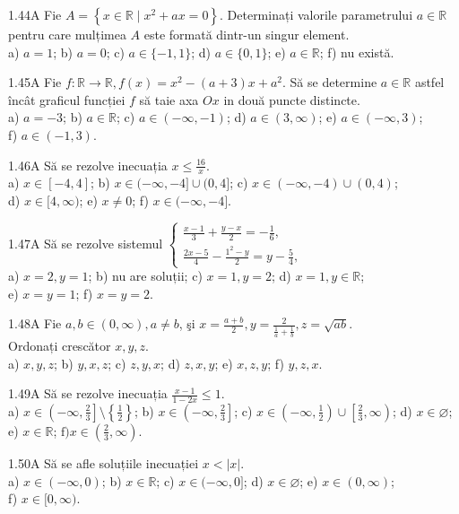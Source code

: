 \documentclass[11pt]{article}
\begin{document}
1.44A Fie $A=\left\{x \in \mathbb{R} \mid x^{2}+a x=0\right\}$. Determinați valorile parametrului $a \in \mathbb{R}$ pentru care mulțimea $A$ este formată dintr-un singur element.\\ a) $a=1$; b) $a=0$; c) $a \in\{-1,1\}$; d) $a \in\{0,1\}$; e) $a \in \mathbb{R}$; f) nu există.

1.45A Fie $f: \mathbb{R} \rightarrow \mathbb{R}, f(x)=x^{2}-(a+3) x+a^{2}$. Să se determine $a \in \mathbb{R}$ astfel încât graficul funcției $f$ să taie axa $O x$ in două puncte distincte.\\ a) $a=-3$; b) $a \in \mathbb{R}$; c) $a \in(-\infty,-1)$; d) $a \in(3, \infty)$; e) $a \in(-\infty, 3)$;\\ f) $a \in(-1, 3)$.

1.46A Să se rezolve inecuația $x \leq \frac{16}{x}$.\\ a) $x \in[-4,4]$; b) $x \in(-\infty,-4] \cup(0,4]$; c) $x \in(-\infty,-4) \cup(0,4)$;\\ d) $x \in[4, \infty)$; e) $x \neq 0$; f) $x \in(-\infty,-4]$.

1.47A Să se rezolve sistemul $\left\{\begin{array}{l}\frac{x-1}{3}+\frac{y-x}{2}=-\frac{1}{6}, \\ \frac{2 x-5}{4}-\frac{1^{2}-y}{2}=y-\frac{5}{4},\end{array}\right.$\\ a) $x=2, y=1$; b) nu are soluții; c) $x=1, y=2$; d) $x=1, y \in \mathbb{R}$;\\ e) $x=y=1$; f) $x=y=2$.

1.48A Fie $a, b \in(0, \infty), a \neq b$, şi $x=\frac{a+b}{2}, y=\frac{2}{\frac{1}{a}+\frac{1}{b}}, z=\sqrt{a b}$.\\ Ordonați crescător $x, y, z$.\\ a) $x, y, z$; b) $y, x, z$; c) $z, y, x$; d) $z, x, y$; e) $x, z, y$; f) $y, z, x$.

1.49A Să se rezolve inecuația $\frac{x-1}{1-2 x} \leq 1$.\\ a) $x \in\left(-\infty, \frac{2}{3}\right] \setminus\left\{\frac{1}{2}\right\}$; b) $x \in\left(-\infty, \frac{2}{3}\right]$; c) $x \in\left(-\infty, \frac{1}{2}\right) \cup\left[\frac{2}{3}, \infty\right)$; d) $x \in \varnothing$; e) $x \in \mathbb{R}$; $\mathrm{f}) x \in\left(\frac{2}{3}, \infty\right)$.

1.50A Să se afle soluțiile inecuației $x<|x|$.\\ a) $x \in(-\infty, 0)$; b) $x \in \mathbb{R}$; c) $x \in(-\infty, 0]$; d) $x \in \varnothing$; e) $x \in(0, \infty)$;\\ f) $x \in[0, \infty)$.
\end{document}
